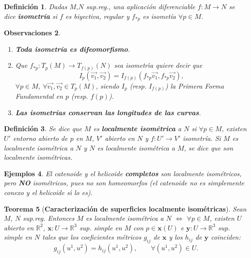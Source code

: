 \documentclass[ebook,oneside]{memoir}
\newtheorem{thm}{Teorema}[chapter]
\newtheorem{defn}[thm]{Definición}
\newtheorem{rem}[thm]{Observaciones}
\newtheorem{eje}[thm]{Ejemplos}
\begin{document}
\begin{defn}
 Dadas $M$,$N$ sup.reg., una aplicaci\'on diferenciable $f:M \longrightarrow N$ se dice \textbf{isometr\'ia} si $f$ es biyectiva, regular y  $f_{*p}$ es isomet\'ia $\forall p \in M$.
\end{defn}


\begin{rem}

\

\begin{enumerate}
\item \textbf{Toda isometr\'ia es difeomorfismo}.

\item
Que $f_{*p}: T_p (M)\rightarrow T_{f(p)}(N)$ sea isometr\'{\i}a quiere decir que $$I_p (\overrightarrow{v_1},\overrightarrow{v_2}) = I_{f(p)}(f_{*p}\overrightarrow{v_1},f_{*p}\overrightarrow{v_2}),$$ $\forall p \in M$, $\forall \overrightarrow{v_1},\overrightarrow{v_2} \in T_p(M)$, siendo $I_p$ (resp. $I_{f(p)}$) la Primera Forma Fundamental en $p$ (resp. $f(p)$).
\item \textbf{Las isometr\'ias conservan las longitudes de las curvas}.
\end{enumerate}
\end{rem}


\begin{defn}
Se dice que $M$ es \textbf{localmente isom\'etrica}
 a $N$ si $\forall p \in M$, existen $U'$ entorno abierto de $p$ en $M$, $V'$ abierto en $N$ y $f: U' \rightarrow V'$ isometr\'ia. Si $M$ es localmente isom\'etrica a $N$ y $N$ es localmente isom\'etrica a $M$, se dice que son localmente isom\'etricas.
\end{defn}


\begin{eje}
El catenoide y el helicoide \textbf{completos} son localmente isom\'etricos, pero \textbf{NO} isom\'etricos, pues no son homeomorfos (el catenoide no es simplemente conexo y el helicoide s\'{\i} lo es).
\end{eje}

\begin{thm}[\textbf{Caracterizaci\'on de superficies localmente isom\'etricas}]
Sean $M$, $N$ sup.reg. Entonces $M$ es localmente isom\'etrica a $N$ $\Leftrightarrow$ $\forall p \in M$, existen $U$ abierto en $\mathbb{R}^2$, $\textbf{x}: U\rightarrow \mathbb{R}^3$ sup. simple en $M$ con $p\in \textbf{x}(U)$ e $\textbf{y}: U\rightarrow \mathbb{R}^3$ sup. simple en $N$ tales que los coeficientes m\'etricos $g_{ij}$ de $\textbf{x}$ y los $h_{ij}$ de $\textbf{y}$ coinciden: $$g_{ij}(u^1,u^2)= h_{ij}(u^1,u^2), \qquad \forall (u^1,u^2) \in U.$$

\end{thm}
\end{document}
